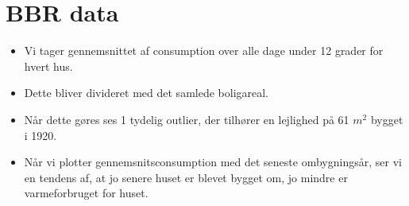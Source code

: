 
\section{BBR data}


\begin{itemize}
    \item Vi tager gennemsnittet af consumption over alle dage under 12 grader for hvert hus.
    \item Dette bliver divideret med det samlede boligareal.
    \item Når dette gøres ses 1 tydelig outlier, der tilhører en lejlighed på 61 $m^2$ bygget i 1920.
    \item Når vi plotter gennemsnitsconsumption med det seneste ombygningsår, ser vi en tendens af, at jo senere huset er blevet bygget om, jo mindre er varmeforbruget for huset.
\end{itemize}    

